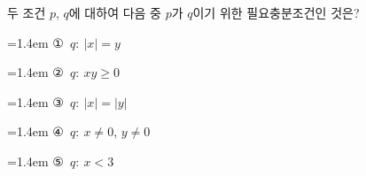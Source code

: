 두 조건 $p$, $q$에 대하여 다음 중 $p$가 $q$이기 위한 필요충분조건인 것은? 
\par\medskip\par\noindent\hangindent=1.4em {\small ①}\ $q:\ |x|=y$\par\noindent\hangindent=1.4em {\small ②}\ $q:\ xy\ge 0$\par\noindent\hangindent=1.4em {\small ③}\ $q:\ |x|=|y|$\par\noindent\hangindent=1.4em {\small ④}\ $q:\ x\ne 0$, $y\ne 0$\par\noindent\hangindent=1.4em {\small ⑤}\ $q:\ x<3$\par\medskip
